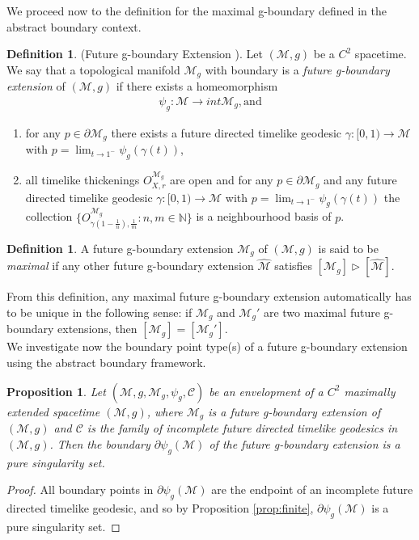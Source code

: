 \documentclass[pdflatex,sn-mathphys-num]{sn-jnl}
\newtheorem{prop}[theorem]{Proposition}
\theoremstyle{definition}
\newtheorem{defn}[theorem]{Definition}
\begin{document}
We proceed now to the definition for the maximal g-boundary defined in the abstract boundary context.\\
\begin{defn}(Future g-boundary Extension \cite{Graf_2024}).
    Let $(\mathcal{M},g)$ be a $C^2$ spacetime. We say that a topological manifold $\mathcal{M}_g$ with boundary is a \textit{future g-boundary extension} of $(\mathcal{M},g)$ if there exists a homeomorphism
    \begin{align*}
        \psi_g: \mathcal{M} \rightarrow int{\mathcal{M}_g}, \text{and}
    \end{align*}
    \begin{enumerate}
        \item for any $p \in \partial\mathcal{M}_g$ there exists a future directed timelike geodesic $\gamma:[0,1) \rightarrow \mathcal{M}$ with $p = \lim_{t \rightarrow 1^-}\psi_g(\gamma(t))$,
        \item all timelike thickenings $O^{\mathcal{M}_g}_{X,r}$ are open and for any $p \in \partial\mathcal{M}_g$ and any future directed timelike geodesic $\gamma:[0,1) \rightarrow \mathcal{M}$ with $p = \lim_{t \rightarrow 1^-}\psi_g(\gamma(t))$ the collection $\{O^{\mathcal{M}_g}_{\dot{\gamma}(1-\frac{1}{n}),\frac{1}{m}}:n,m\in\mathbb{N}\}$ is a neighbourhood basis of $p$.
    \end{enumerate}
\end{defn}
\begin{defn}\label{maximal}
    A future g-boundary extension $\mathcal{M}_g$ of $(\mathcal{M},g)$ is said to be {\it maximal} if any other future g-boundary extension $\hat{\mathcal{M}}$ satisfies $[\mathcal{M}_g] \vartriangleright [\hat{\mathcal{M}}]$.
\end{defn}

    From this definition, any maximal future g-boundary extension automatically has to be unique in the following sense: if $\mathcal{M}_g$ and $\mathcal{M}_g'$ are two maximal future g-boundary extensions, then $[\mathcal{M}_g] = [\mathcal{M}_g']$.\\

We investigate now the boundary point type(s) of a future g-boundary extension using the abstract boundary framework.
\begin{prop}\label{prop:pure g-boundary}
     Let $(\mathcal{M},g,\mathcal{M}_g,\psi_g,\mathcal{C})$ be an envelopment of a $C^{2}$ maximally extended spacetime $(\mathcal{M},g)$, where $\mathcal{M}_g$ is a future g-boundary extension of $(\mathcal{M},g)$ and $\mathcal{C}$ is the family of incomplete future directed timelike geodesics in $(\mathcal{M},g)$. Then the boundary $\partial\psi_g(\mathcal{M})$ of the future g-boundary extension is a pure singularity set.
\end{prop}
\begin{proof}
    All boundary points in $\partial\psi_g(\mathcal{M})$ are the endpoint of an incomplete future directed timelike geodesic, and so by Proposition \ref{prop:finite}, $\partial\psi_g(\mathcal{M})$ is a pure singularity set.
\end{proof}
\end{document}
